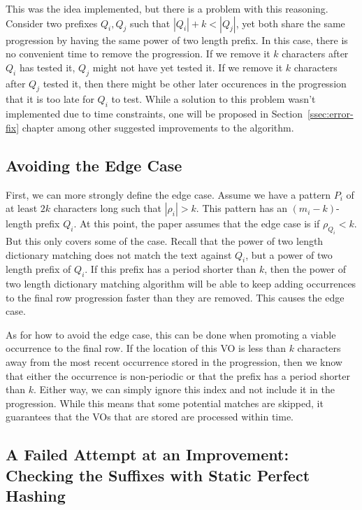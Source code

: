\documentclass[ %
                    author={Dominic Joseph Moylett},
                    degree={MEng},
                     title={Dictionary Matching with Fingerprints},
                  subtitle={An Empirical Analysis},
                      type={research},
                      year={2015} ]{dissertation}
\begin{document}
This was the idea implemented, but there is a problem with this reasoning. Consider two prefixes $Q_i, Q_j$ such that $|Q_i| + k < |Q_j|$, yet both share the same progression by having the same power of two length prefix. In this case, there is no convenient time to remove the progression. If we remove it $k$ characters after $Q_i$ has tested it, $Q_j$ might not have yet tested it. If we remove it $k$ characters after $Q_j$ tested it, then there might be other later occurences in the progression that it is too late for $Q_i$ to test. While a solution to this problem wasn't implemented due to time constraints, one will be proposed in Section~\ref{ssec:error-fix} chapter among other suggested improvements to the algorithm.

\subsection{Avoiding the Edge Case}
\label{ssec:impl-edge-case}

First, we can more strongly define the edge case. Assume we have a pattern $P_i$ of at least $2k$ characters long such that $|\rho_i| > k$. This pattern has an $(m_i - k)$-length prefix $Q_i$. At this point, the paper assumes that the edge case is if $\rho_{Q_i} < k$. But this only covers some of the case. Recall that the power of two length dictionary matching does not match the text against $Q_i$, but a power of two length prefix of $Q_i$. If this prefix has a period shorter than $k$, then the power of two length dictionary matching algorithm will be able to keep adding occurrences to the final row progression faster than they are removed. This causes the edge case.

As for how to avoid the edge case, this can be done when promoting a viable occurrence to the final row. If the location of this VO is less than $k$ characters away from the most recent occurrence stored in the progression, then we know that either the occurrence is non-periodic or that the prefix has a period shorter than $k$. Either way, we can simply ignore this index and not include it in the progression. While this means that some potential matches are skipped, it guarantees that the VOs that are stored are processed within time.

\subsection{A Failed Attempt at an Improvement: Checking the Suffixes with Static Perfect Hashing}
\label{ssec:static-hash-fail}
\end{document}
